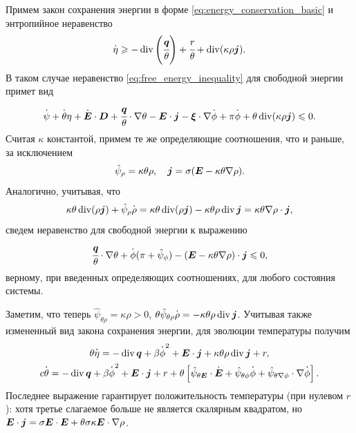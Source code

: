Примем закон сохранения энергии в форме \eqref{eq:energy_conservation_basic} и энтропийное неравенство
\[
    \overset{\boldsymbol{.}}{\eta} \geqslant -\operatorname{{div}} \left( \cfrac{{\boldsymbol{q}}}{\theta} \right) + \cfrac{r}{\theta} + \operatorname{{div}}(\kappa \rho {\boldsymbol{j}}).
\]
В таком случае неравенство \eqref{eq:free_energy_inequality} для свободной энергии примет вид
\[
    \overset{\boldsymbol{.}}{\psi} + \overset{\boldsymbol{.}}{\theta} \eta + \overset{\boldsymbol{.}}{{\boldsymbol{E}}} \cdot {\boldsymbol{D}} + \cfrac{{\boldsymbol{q}}}{\theta} \cdot \nabla \theta - {\boldsymbol{E}} \cdot {\boldsymbol{j}} - {\boldsymbol{\xi}} \cdot \nabla \overset{\boldsymbol{.}}{\phi} + \pi \overset{\boldsymbol{.}}{\phi} + \theta \operatorname{{div}}(\kappa \rho {\boldsymbol{j}}) \leqslant 0.
\]
Считая $\kappa$ константой, примем те же определяющие соотношения, что и раньше, за исключением
\[
    \hat{\psi}_\rho = \kappa \theta \rho, \quad {\boldsymbol{j}} = \sigma ({\boldsymbol{E}} - \kappa \theta \nabla \rho).
\]
Аналогично, учитывая, что
\[
    \kappa \theta \operatorname{{div}}(\rho {\boldsymbol{j}}) + \hat{\psi}_\rho \overset{\boldsymbol{.}}{\rho} = \kappa \theta \operatorname{{div}}(\rho {\boldsymbol{j}}) - \kappa \theta \rho \operatorname{{div}} {\boldsymbol{j}} = \kappa \theta \nabla \rho \cdot {\boldsymbol{j}},
\]
сведем неравенство для свободной энергии к выражению
\[
    \cfrac{{\boldsymbol{q}}}{\theta} \cdot \nabla \theta + \overset{\boldsymbol{.}}{\phi}(\pi + \hat{\psi}_\phi) - ({\boldsymbol{E}} - \kappa \theta \nabla \rho) \cdot {\boldsymbol{j}} \leqslant 0,
\]
верному, при введенных определяющих соотношениях, для любого состояния системы.

Заметим, что теперь $\hat{\psi}_{\theta \rho} = \kappa \rho > 0$, $\theta \hat{\psi}_{\theta \rho} \overset{\boldsymbol{.}}{\rho} = -\kappa \theta \rho \operatorname{{div}} {\boldsymbol{j}}$. Учитывая также измененный вид закона сохранения энергии, для эволюции температуры получим
\begin{gather*}
    \theta \overset{\boldsymbol{.}}{\eta} = -\operatorname{{div}} {\boldsymbol{q}} + \beta \overset{\boldsymbol{.}}{\phi}^2 + {\boldsymbol{E}} \cdot {\boldsymbol{j}} + \kappa \theta \rho \operatorname{{div}} {\boldsymbol{j}} + r, \\
    c \overset{\boldsymbol{.}}{\theta} = -\operatorname{{div}} {\boldsymbol{q}} + \beta \overset{\boldsymbol{.}}{\phi}^2 + {\boldsymbol{E}} \cdot {\boldsymbol{j}} + r + \theta \left[ \hat{\psi}_{\theta {\boldsymbol{E}}} \cdot \overset{\boldsymbol{.}}{{\boldsymbol{E}}} + \hat{\psi}_{\theta \phi} \overset{\boldsymbol{.}}{\phi} + \hat{\psi}_{\theta \nabla \phi} \cdot \nabla \overset{\boldsymbol{.}}{\phi} \right].
\end{gather*}
Последнее выражение гарантирует положительность температуры (при нулевом $r$): хотя третье слагаемое больше не является скалярным квадратом, но ${\boldsymbol{E}} \cdot {\boldsymbol{j}} = \sigma {\boldsymbol{E}} \cdot {\boldsymbol{E}} + \theta \sigma \kappa {\boldsymbol{E}} \cdot \nabla \rho$.

